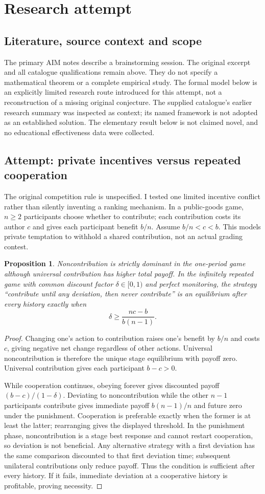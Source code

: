 \documentclass[11pt]{article}
\newtheorem{proposition}{Proposition}
\begin{document}
\section{Research attempt}
\subsection{Literature, source context and scope}
The primary AIM notes describe a brainstorming session. The original excerpt and all catalogue qualifications remain above. They do not specify a mathematical theorem or a complete empirical study. The formal model below is an explicitly limited research route introduced for this attempt, not a reconstruction of a missing original conjecture. The supplied catalogue's earlier research summary was inspected as context; its named framework is not adopted as an established solution. The elementary result below is not claimed novel, and no educational effectiveness data were collected.

\subsection{Attempt: private incentives versus repeated cooperation}
The original competition rule is unspecified. I tested one limited incentive conflict rather than silently inventing a ranking mechanism. In a public-goods game, $n\ge2$ participants choose whether to contribute; each contribution costs its author $c$ and gives each participant benefit $b/n$. Assume $b/n<c<b$. This models private temptation to withhold a shared contribution, not an actual grading contest.
\begin{proposition}
Noncontribution is strictly dominant in the one-period game although universal contribution has higher total payoff. In the infinitely repeated game with common discount factor $\delta\in[0,1)$ and perfect monitoring, the strategy ``contribute until any deviation, then never contribute'' is an equilibrium after every history exactly when
\[
\delta\ge\frac{nc-b}{b(n-1)}.
\]
\end{proposition}
\begin{proof}
Changing one's action to contribution raises one's benefit by $b/n$ and costs $c$, giving negative net change regardless of other actions. Universal noncontribution is therefore the unique stage equilibrium with payoff zero. Universal contribution gives each participant $b-c>0$.

While cooperation continues, obeying forever gives discounted payoff $(b-c)/(1-\delta)$. Deviating to noncontribution while the other $n-1$ participants contribute gives immediate payoff $b(n-1)/n$ and future zero under the punishment. Cooperation is preferable exactly when the former is at least the latter; rearranging gives the displayed threshold. In the punishment phase, noncontribution is a stage best response and cannot restart cooperation, so deviation is not beneficial. Any alternative strategy with a first deviation has the same comparison discounted to that first deviation time; subsequent unilateral contributions only reduce payoff. Thus the condition is sufficient after every history. If it fails, immediate deviation at a cooperative history is profitable, proving necessity.
\end{proof}
\end{document}
